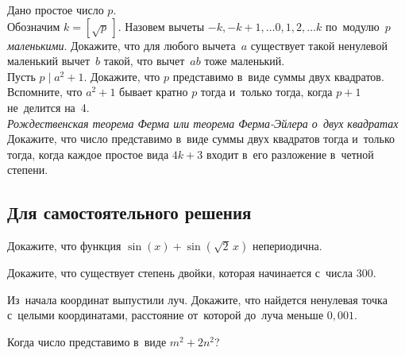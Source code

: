 \begin{problems}

\item
Дано простое число $p$.
\\
\sp
Обозначим $k = [\sqrt{p}\,]$.
Назовем вычеты $-k, -k+1, \ldots 0, 1, 2, \ldots k$ по~модулю~$p$
\emph{маленькими}.
Докажите, что для любого вычета~$a$ существует такой ненулевой маленький
вычет~$b$ такой, что вычет~$a b$ тоже маленький.
\\
\sp
Пусть $p \mid a^2 + 1$.
Докажите, что $p$ представимо в~виде суммы двух квадратов.
\\
\sp
Вспомните, что $a^2 + 1$ бывает кратно $p$ тогда и~только тогда, когда $p + 1$
не~делится на~4.
\\
\sp
\emph{Рождественская теорема Ферма или теорема Ферма-Эйлера о~двух квадратах}
Докажите, что число представимо в~виде суммы двух квадратов тогда и~только
тогда, когда каждое простое вида $4 k + 3$ входит в~его разложение в~четной
степени.

\end{problems}

\subsection*{Для самостоятельного решения}

\begin{problems}

\item
Докажите, что функция $\sin(x) + \sin(\sqrt{2} \, x)$ непериодична.

\item
Докажите, что существует степень двойки, которая начинается с~числа $300$.

\item
Из~начала координат выпустили луч.
Докажите, что найдется ненулевая точка с~целыми координатами, расстояние
от~которой до~луча меньше $0{,}001$.

\item
Когда число представимо в~виде $m^2 + 2 n^2$?

\end{problems}

